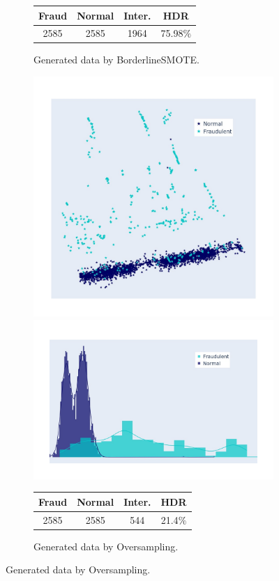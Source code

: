 \begin{figure}[h!]
\begin{subfigure}[]{0.3\linewidth}
		\begin{tabular}{c|c|c|c}
			Fraud & Normal & Inter. & HDR  \\
			\hline
			2585  & 2585  & 1964 & 75.98\(\%\) \\
		\end{tabular}
		\caption{Generated data by BorderlineSMOTE. }
		\label{fig:BorderlineSMOTE_hist}
	\end{subfigure}
	\hspace{0.1em}%
	\begin{subfigure}[]{0.3\linewidth}	
		\includegraphics[width=\linewidth,trim=40 40 40 40,clip]{Figures/creditcard/PCA/Oversampling-data-run-0-0}
		\includegraphics[width=\linewidth,trim=40 40 40 40,clip]{Figures/creditcard/PCA/Oversampling-data-run-0-0_DIST}
		\begin{tabular}{c|c|c|c}
			Fraud & Normal & Inter. & HDR  \\
			\hline
			2585  & 2585  & 544 & 21.4\(\%\) \\
		\end{tabular}
		\caption{Generated data by Oversampling. }
		\label{fig:Oversampling_hist}
	\end{subfigure}


\end{figure}
